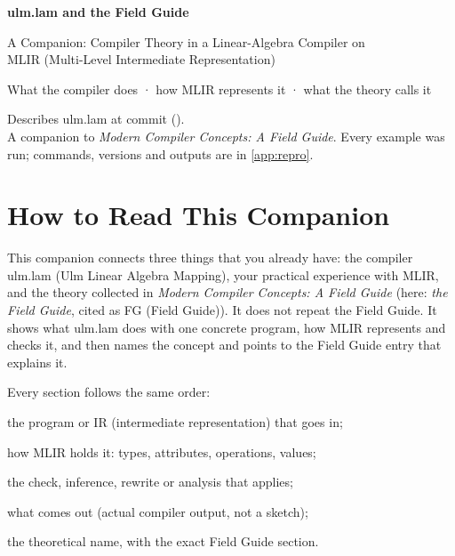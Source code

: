 \documentclass[11pt,a4paper,openany]{book}
\begin{document}
\frontmatter
\begin{titlepage}
  \centering
  \vspace*{0.18\textheight}
  {\sffamily\bfseries\fontsize{28}{34}\selectfont ulm.lam and the Field Guide\par}
  \vspace{0.6em}
  {\sffamily\Large\color{accent} A Companion: Compiler Theory in a Linear-Algebra Compiler on\\ MLIR (Multi-Level Intermediate Representation)\par}
  \vspace{2.4em}
  {\large What the compiler does · how MLIR represents it · what the theory calls it\par}
  \vfill
  {\small\color{metacolor}
   Describes ulm.lam at commit \href{\repo/tree/\commit}{\texttt{\shortcommit}}
   (\texttt{\commit}).\\[2pt]
   A companion to \emph{Modern Compiler Concepts: A Field Guide}.
   Every example was run; commands, versions and outputs are in \cref{app:repro}.\par}
  \vspace{1em}
\end{titlepage}

\chapter*{How to Read This Companion}
\label{ch:howto}

This companion connects three things that you already have: the compiler
ulm.lam (Ulm Linear Algebra Mapping), your practical experience with MLIR, and the theory collected in
\emph{Modern Compiler Concepts: A Field Guide} (here: \emph{the Field Guide},
cited as FG (Field Guide)). It does not repeat the Field Guide. It shows what ulm.lam
does with one concrete program, how MLIR represents and checks it, and then
names the concept and points to the Field Guide entry that explains it.

Every section follows the same order:

\begin{steps}
\item[Input] the program or IR (intermediate representation) that goes in;
\item[Representation] how MLIR holds it: types, attributes, operations, values;
\item[Rule] the check, inference, rewrite or analysis that applies;
\item[Output] what comes out (actual compiler output, not a sketch);
\item[Theory] the theoretical name, with the exact Field Guide section.
\end{steps}
\end{document}

